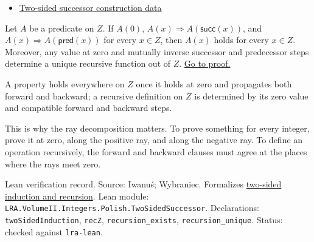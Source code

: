\begin{dependencies}
\begin{itemize}
  \item \hyperref[def:two-sided-successor-construction-data]{Two-sided successor construction data}
\end{itemize}
\end{dependencies}

\begin{theorem}
\label{thm:two-sided-induction-and-recursion}
Let \(A\) be a predicate on \(Z\). If \(A(0)\), \(A(x)\Rightarrow
A(\mathsf{succ}(x))\), and \(A(x)\Rightarrow A(\mathsf{pred}(x))\)
for every \(x\in Z\), then \(A(x)\) holds for every \(x\in Z\).
Moreover, any value at zero and mutually inverse successor and predecessor
steps determine a unique recursive function out of \(Z\).
\hyperref[prf:two-sided-induction-and-recursion]{Go to proof.}
\end{theorem}

\begin{remark*}
A property holds everywhere on \(Z\) once it holds at zero and propagates both
forward and backward; a recursive definition on \(Z\) is determined by its
zero value and compatible forward and backward steps.
\end{remark*}

\begin{remark*}[Interpretation]
This is why the ray decomposition matters. To prove something for every
integer, prove it at zero, along the positive ray, and along the negative ray.
To define an operation recursively, the forward and backward clauses must
agree at the places where the rays meet zero.
\end{remark*}

\begin{remark*}[Exposition]
Lean verification record. Source: Iwanu{\'s}; Wybraniec. Formalizes
\hyperref[thm:two-sided-induction-and-recursion]{two-sided induction and
recursion}. Lean module:
\texttt{LRA.VolumeII.Integers.Polish.TwoSidedSuccessor}. Declarations:
\texttt{twoSidedInduction}, \texttt{recZ}, \texttt{recursion\_exists},
\texttt{recursion\_unique}. Status: checked against \texttt{lra-lean}.
\end{remark*}

